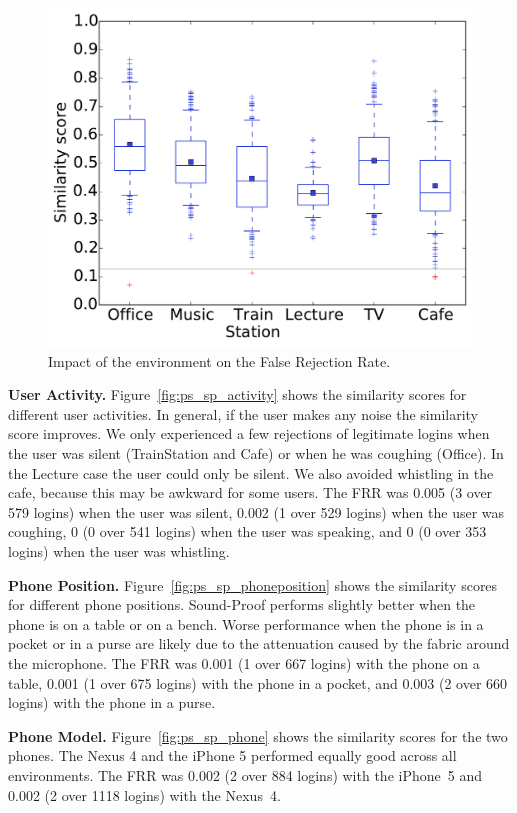 \begin{figure}[!ht]
    \centering
    \includegraphics[width=.8\linewidth]{figures/phonesecures/sound-proof_box_place.pdf}
    \caption[Impact of the environment on the False Rejection Rate]{Impact of the
    environment on the False Rejection Rate.}
    \label{fig:ps_sp_environment}
\end{figure}

\noindent\textbf{User Activity.}
Figure~\ref{fig:ps_sp_activity} shows the similarity scores for different user activities.
In general, if the user makes any noise the similarity score improves.
We only experienced a few rejections of legitimate logins when the user was silent (TrainStation and Cafe) or when he was coughing (Office).
In the Lecture case the user could only be silent.
We also avoided whistling in the cafe, because this may be awkward for some users.
The FRR was
0.005 (3 over 579 logins) when the user was silent,
0.002 (1 over 529 logins) when the user was coughing,
0 (0 over 541 logins) when the user was speaking, and
0 (0 over 353 logins) when the user was whistling. %


\noindent\textbf{Phone Position.}
Figure~\ref{fig:ps_sp_phoneposition} shows the similarity scores for different phone positions.
Sound-Proof performs slightly better when the phone is on a table or on a bench.
Worse performance when the phone is in a pocket or in a purse are likely due to the attenuation caused by the fabric around the microphone.
The FRR was
0.001 (1 over 667 logins) with the phone on a table,
0.001 (1 over 675 logins) with the phone in a pocket, and
0.003 (2 over 660 logins) with the phone in a purse. %


\noindent\textbf{Phone Model.}
Figure~\ref{fig:ps_sp_phone} shows the similarity scores for the two phones.
The Nexus 4 and the iPhone 5 performed equally good across all environments.
The FRR was
0.002 (2 over 884 logins) with the iPhone~5 and
0.002 (2 over 1118  logins) with the Nexus~4. %


